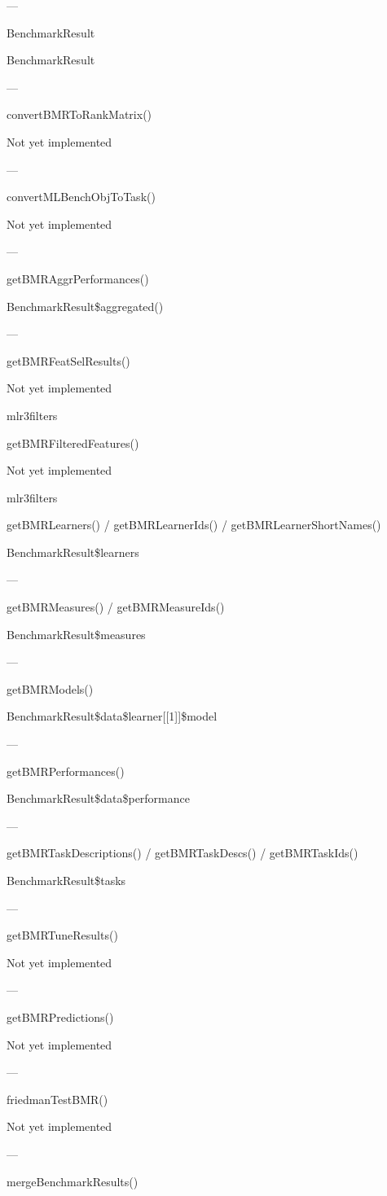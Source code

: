 \documentclass[]{article}
\begin{document}
---

BenchmarkResult

BenchmarkResult

---

convertBMRToRankMatrix()

Not yet implemented

---

convertMLBenchObjToTask()

Not yet implemented

---

getBMRAggrPerformances()

BenchmarkResult\$aggregated()

---

getBMRFeatSelResults()

Not yet implemented

mlr3filters

getBMRFilteredFeatures()

Not yet implemented

mlr3filters

getBMRLearners() / getBMRLearnerIds() / getBMRLearnerShortNames()

BenchmarkResult\$learners

---

getBMRMeasures() / getBMRMeasureIds()

BenchmarkResult\$measures

---

getBMRModels()

BenchmarkResult\$data\$learner{[}{[}1{]}{]}\$model

---

getBMRPerformances()

BenchmarkResult\$data\$performance

---

getBMRTaskDescriptions() / getBMRTaskDescs() / getBMRTaskIds()

BenchmarkResult\$tasks

---

getBMRTuneResults()

Not yet implemented

---

getBMRPredictions()

Not yet implemented

---

friedmanTestBMR()

Not yet implemented

---

mergeBenchmarkResults()
\end{document}
